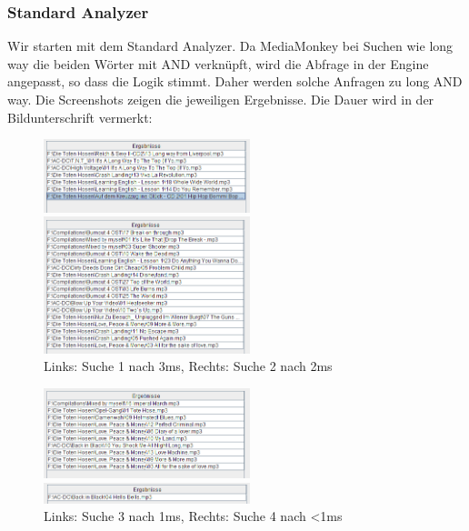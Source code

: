 \documentclass[12pt,a4paper,ngerman]{report}
\begin{document}
\subsubsection{Standard Analyzer}
Wir starten mit dem Standard Analyzer. Da MediaMonkey bei Suchen wie long way die beiden Wörter mit AND verknüpft, wird die Abfrage in der Engine angepasst, so dass die Logik stimmt. Daher werden solche Anfragen zu long AND way. Die Screenshots zeigen die jeweiligen Ergebnisse. Die Dauer wird in der Bildunterschrift vermerkt:
\begin{figure}[h!]
\centering
	\begin{minipage}[b]{7cm}
	\includegraphics[width=6cm]{img/search1_stanAn_3MS.png}
	\end{minipage}
	\begin{minipage}[b]{7cm}
	\includegraphics[width=6cm]{img/search2_stanAn_2MS.png}
	\end{minipage}
\caption{Links: Suche 1 nach 3ms, Rechts: Suche 2 nach 2ms\protect\footnotemark}
\end{figure}
\begin{figure}[h!]
\centering
	\begin{minipage}[b]{7cm}
	\includegraphics[width=6cm]{img/search3_stanAn_1MS.png}
	\end{minipage}
	\begin{minipage}[b]{7cm}
	\includegraphics[width=6cm]{img/search4_stanAn_0MS.png}
	\end{minipage}
\caption{Links: Suche 3 nach 1ms, Rechts: Suche 4 nach \textless 1ms\protect\footnotemark}
\end{figure}
\end{document}
